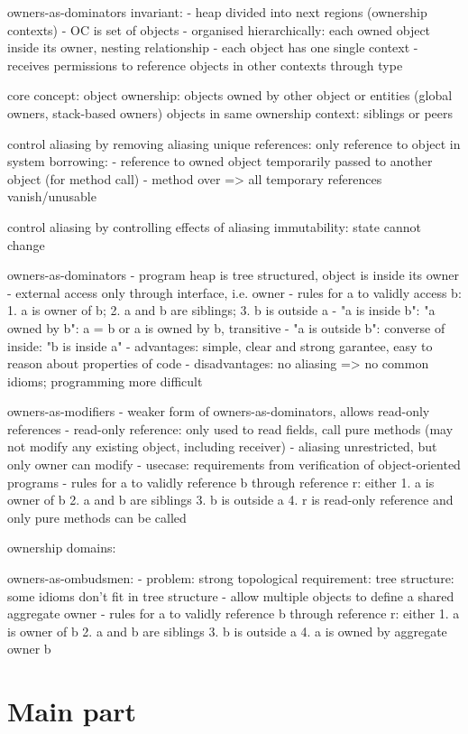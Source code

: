 \documentclass[sigplan,11pt,nonacm]{acmart}
\begin{document}
owners-as-dominators invariant:
- heap divided into next regions (ownership contexts)
- OC is set of objects
- organised hierarchically: each owned object inside its owner, nesting relationship
- each object has one single context
- receives permissions to reference objects in other contexts through type

core concept: object ownership: objects owned by other object or entities (global owners, stack-based owners)
objects in same ownership context: siblings or peers

control aliasing by removing aliasing
unique references: only reference to object in system
borrowing: 
- reference to owned object temporarily passed to another object (for method call)
- method over => all temporary references vanish/unusable

control aliasing by controlling effects of aliasing
immutability: state cannot change

owners-as-dominators
- program heap is tree structured, object is inside its owner
- external access only through interface, i.e. owner
- rules for a to validly access b: 1. a is owner of b; 2. a and b are siblings; 3. b is outside a
- "a is inside b": "a owned by b": a = b or a is owned by b, transitive
- "a is outside b": converse of inside: "b is inside a"
- advantages: simple, clear and strong garantee, easy to reason about properties of code
- disadvantages: no aliasing => no common idioms; programming more difficult

owners-as-modifiers
- weaker form of owners-as-dominators, allows read-only references
- read-only reference: only used to read fields, call pure methods (may not modify any existing object, including receiver)
- aliasing unrestricted, but only owner can modify
- usecase: requirements from verification of object-oriented programs
- rules for a to validly reference b through reference r: either
1. a is owner of b
2. a and b are siblings
3. b is outside a
4. r is read-only reference and only pure methods can be called

ownership domains:

owners-as-ombudsmen:
- problem: strong topological requirement: tree structure: some idioms don't fit in tree structure
- allow multiple objects to define a shared aggregate owner
- rules for a to validly reference b through reference r: either
1. a is owner of b
2. a and b are siblings
3. b is outside a
4. a is owned by aggregate owner b




\section{Main part}
\label{sec:mainpart}
\end{document}

